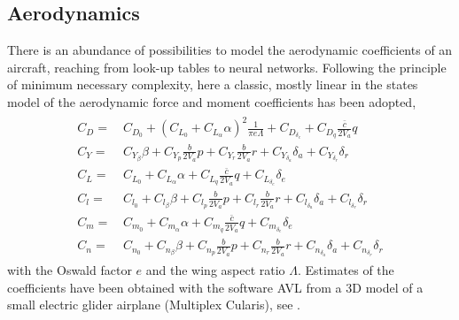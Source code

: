 \documentclass{ifacconf}
\begin{document}
\subsection{Aerodynamics}
There is an abundance of possibilities to model the aerodynamic coefficients of an aircraft, reaching from look-up tables to neural networks. Following the principle of minimum necessary complexity, here a classic, mostly linear in the states model of the aerodynamic force and moment coefficients has been adopted, \cite{Beard2012}
%
\begin{align}
\begin{split}
C_D =&\,C_{D_0} + \left(C_{L_0} + C_{L_\alpha}\alpha\right)^2\frac{1}{\pi e \Lambda} + C_{D_{\delta_e}} + C_{D_{q}}\frac{\bar{c}}{2V_a}q
\label{eq:aerocoeffcd} \\
C_Y =&\,C_{Y_\beta}\beta + C_{Y_p}\frac{b}{2V_a}p + C_{Y_r}\frac{b}{2V_a}r + C_{Y_{\delta_a}}\delta_a + C_{Y_{\delta_r}}\delta_r\\
C_L =&\,C_{L_0} + C_{L_\alpha}\alpha +C_{L_q}\frac{\bar{c}}{2V_a}q +C_{L_{\delta_e}}\delta_e\\
C_l =&\,C_{l_0}+C_{l_{\beta}}\beta + C_{l_{p}}\frac{b}{2V_a}p +C_{l_{r}}\frac{b}{2V_a}r +C_{l_{\delta_a}}\delta_a +C_{l_{\delta_r}}\delta_r\\
C_m =&\,C_{m_0} + C_{m_\alpha}\alpha + C_{m_q}\frac{\bar{c}}{2V_a}q + C_{m_{\delta_e}}\delta_e\\
C_n =&\,C_{n_0}+C_{n_\beta}\beta + C_{n_p}\frac{b}{2V_a}p + C_{n_r}\frac{b}{2V_a}r+ C_{n_{\delta_a}}\delta_a+ C_{n_{\delta_r}}\delta_r
\end{split}
\end{align}
%
with the Oswald factor $e$ and the wing aspect ratio $\Lambda$. Estimates of the coefficients have been obtained with the software AVL from a 3D model of a small electric glider airplane (Multiplex Cularis), see \cite{StollePhD2016}.
\end{document}
